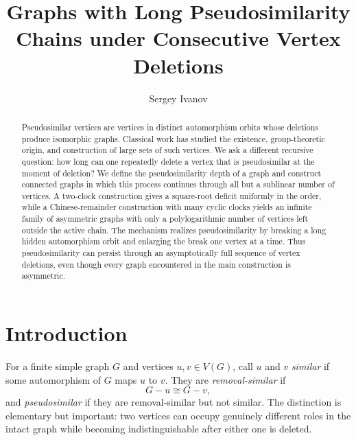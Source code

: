 \documentclass[11pt]{article}
\title{Graphs with Long Pseudosimilarity Chains under Consecutive Vertex Deletions}
\author{Sergey Ivanov}
\date{}
\theoremstyle{definition}
\theoremstyle{remark}
\begin{document}
\maketitle

\begin{abstract}
Pseudosimilar vertices are vertices in distinct automorphism orbits whose deletions produce isomorphic graphs. Classical work has studied the existence, group-theoretic origin, and construction of large sets of such vertices. We ask a different recursive question: how long can one repeatedly delete a vertex that is pseudosimilar at the moment of deletion? We define the pseudosimilarity depth of a graph and construct connected graphs in which this process continues through all but a sublinear number of vertices. A two-clock construction gives a square-root deficit uniformly in the order, while a Chinese-remainder construction with many cyclic clocks yields an infinite family of asymmetric graphs with only a polylogarithmic number of vertices left outside the active chain. The mechanism realizes pseudosimilarity by breaking a long hidden automorphism orbit and enlarging the break one vertex at a time. Thus pseudosimilarity can persist through an asymptotically full sequence of vertex deletions, even though every graph encountered in the main construction is asymmetric.
\end{abstract}

\section{Introduction}

For a finite simple graph $G$ and vertices $u,v\in V(G)$, call $u$ and $v$ \emph{similar} if some automorphism of $G$ maps $u$ to $v$. They are \emph{removal-similar} if
\[
    G-u \cong G-v,
\]
and \emph{pseudosimilar} if they are removal-similar but not similar. The distinction is elementary but important: two vertices can occupy genuinely different roles in the intact graph while becoming indistinguishable after either one is deleted.
\end{document}
